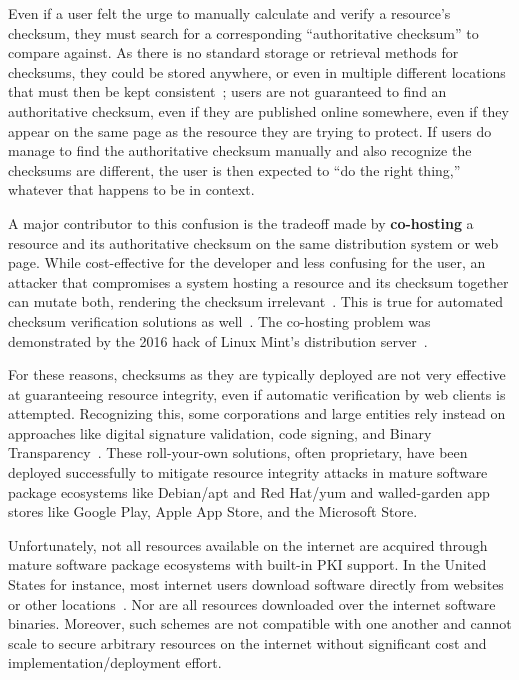 Even if a user felt the urge to manually calculate and verify a resource's
checksum, they must search for a corresponding ``authoritative checksum'' to
compare against. As there is no standard storage or retrieval methods for
checksums, they could be stored anywhere, or even in multiple different
locations that must then be kept consistent~\cite{Cherubini}; users are not
guaranteed to find an authoritative checksum, even if they are published online
somewhere, even if they appear on the same page as the resource they are trying
to protect. If users do manage to find the authoritative checksum manually and
also recognize the checksums are different, the user is then expected to ``do
the right thing,'' whatever that happens to be in context.

A major contributor to this confusion is the tradeoff made by
\textbf{co-hosting} a resource and its authoritative checksum on the same
distribution system or web page. While cost-effective for the developer and less
confusing for the user, an attacker that compromises a system hosting a resource
and its checksum together can mutate both, rendering the checksum
irrelevant~\cite{Stickler}. This is true for automated checksum verification
solutions as well~\cite{Cherubini}. The co-hosting problem was demonstrated by
the 2016 hack of Linux Mint's distribution server~\cite{SCA-MINT1, SCA-MINT2}.

For these reasons, checksums as they are typically deployed are not very
effective at guaranteeing resource integrity, even if automatic verification by
web clients is attempted. Recognizing this, some corporations and large entities
rely instead on approaches like digital signature validation, code signing, and
Binary Transparency~\cite{PKI, BinaryTransparency}. These roll-your-own
solutions, often proprietary, have been deployed successfully to mitigate
resource integrity attacks in mature software package ecosystems like Debian/apt
and Red Hat/yum and walled-garden app stores like Google Play, Apple App Store,
and the Microsoft Store.

Unfortunately, not all resources available on the internet are acquired through
mature software package ecosystems with built-in PKI support. In the United
States for instance, most internet users download software directly from
websites or other locations~\cite{Cherubini, Ryan}. Nor are all resources
downloaded over the internet software binaries. Moreover, such schemes are not
compatible with one another and cannot scale to secure arbitrary resources on
the internet without significant cost and implementation/deployment effort.


